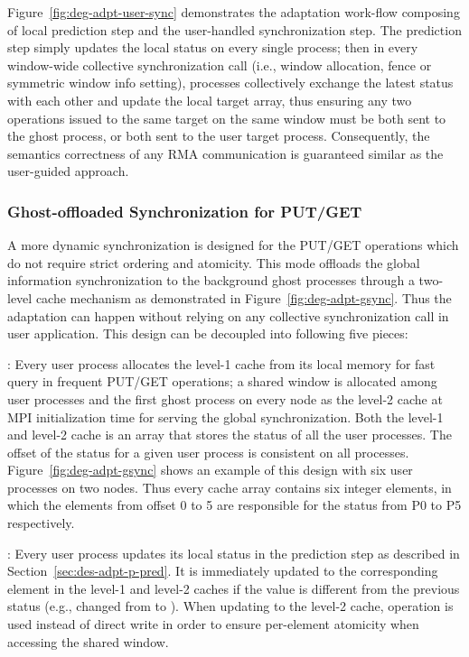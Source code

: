 Figure~\ref{fig:deg-adpt-user-sync} demonstrates the adaptation
work-flow composing of local prediction step and the user-handled
synchronization step. The prediction step simply updates the local
status on every single process; then in every window-wide collective
synchronization call (i.e., window allocation, fence or symmetric window
info setting), processes collectively exchange the latest status with
each other and update the local target array, thus ensuring any two
operations issued to the same target on the same window must be both
sent to the ghost process, or both sent to the user target process.
Consequently, the semantics correctness of any RMA communication is
guaranteed similar as the user-guided approach.


\subsubsection{Ghost-offloaded Synchronization for PUT/GET}
\label{fig:deg-gadpt}
A more dynamic synchronization is designed for the PUT/GET
operations which do not require strict ordering and atomicity. This
mode offloads the global information synchronization to the background
ghost processes through a two-level cache mechanism as demonstrated in
Figure~\ref{fig:deg-adpt-gsync}. Thus the adaptation can happen without
relying on any collective synchronization call in user application.
This design can be decoupled into following five pieces:

:
Every user process allocates the level-1 cache from its local memory
for fast query in frequent PUT/GET operations; a shared window is
allocated among user processes and the first ghost process on every
node as the level-2 cache at MPI initialization time for serving
the global synchronization. Both the level-1 and level-2 cache is
an array that stores the status of all the user processes. The offset
of the status for a given user process is consistent on all processes.
Figure~\ref{fig:deg-adpt-gsync} shows an example of this design with six
user processes on two nodes. Thus every cache array contains six integer
elements, in which the elements from offset 0 to 5 are responsible for
the status from P0 to P5 respectively.

:
Every user process updates its local status in the prediction step as
described in Section~\ref{sec:des-adpt-p-pred}. It is immediately
updated to the corresponding element in the level-1 and level-2 caches
if the value is different from the previous status (e.g., changed from
 to ). When updating to the level-2 cache, 
operation is used instead of direct write in order to ensure per-element
atomicity when accessing the shared window.

